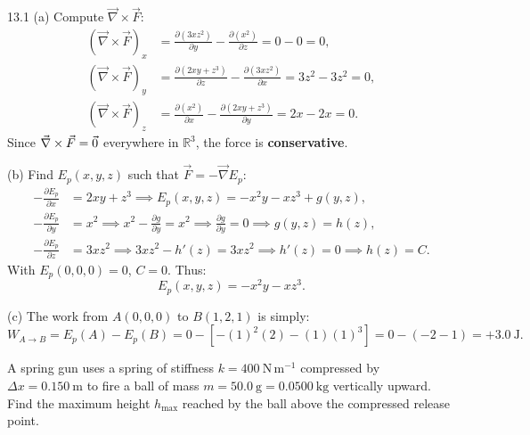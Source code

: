 \begin{solution}{13.1}
(a) Compute $\vec{\nabla}\times\vec{F}$:
\begin{align*}
(\vec{\nabla}\times\vec{F})_x &= \frac{\partial(3xz^2)}{\partial y} - \frac{\partial(x^2)}{\partial z} = 0 - 0 = 0, \\
(\vec{\nabla}\times\vec{F})_y &= \frac{\partial(2xy + z^3)}{\partial z} - \frac{\partial(3xz^2)}{\partial x} = 3z^2 - 3z^2 = 0, \\
(\vec{\nabla}\times\vec{F})_z &= \frac{\partial(x^2)}{\partial x} - \frac{\partial(2xy + z^3)}{\partial y} = 2x - 2x = 0.
\end{align*}
Since $\vec{\nabla}\times\vec{F} = \vec{0}$ everywhere in $\mathbb{R}^3$, the force is \textbf{conservative}.

(b) Find $E_p(x, y, z)$ such that $\vec{F} = -\vec{\nabla} E_p$:
\begin{align*}
-\frac{\partial E_p}{\partial x} &= 2xy + z^3 \implies E_p(x, y, z) = -x^2 y - x z^3 + g(y, z), \\
-\frac{\partial E_p}{\partial y} &= x^2 \implies x^2 - \frac{\partial g}{\partial y} = x^2 \implies \frac{\partial g}{\partial y} = 0 \implies g(y, z) = h(z), \\
-\frac{\partial E_p}{\partial z} &= 3xz^2 \implies 3xz^2 - h'(z) = 3xz^2 \implies h'(z) = 0 \implies h(z) = C.
\end{align*}
With $E_p(0, 0, 0) = 0$, $C = 0$. Thus:
\[
\boxed{E_p(x, y, z) = -x^2 y - x z^3.}
\]

(c) The work from $A(0,0,0)$ to $B(1,2,1)$ is simply:
\[
W_{A\to B} = E_p(A) - E_p(B) = 0 - \left[ -(1)^2(2) - (1)(1)^3 \right] = 0 - (-2 - 1) = \mathbf{+3.0\ \mathrm{J}.}
\]
\end{solution}

\begin{worked}
A spring gun uses a spring of stiffness $k = 400\ \mathrm{N\,m^{-1}}$ compressed by $\Delta x = 0.150\ \mathrm{m}$ to fire a ball of mass $m = 50.0\ \mathrm{g} = 0.0500\ \mathrm{kg}$ vertically upward.
Find the maximum height $h_{\max}$ reached by the ball above the compressed release point.
\end{worked}


